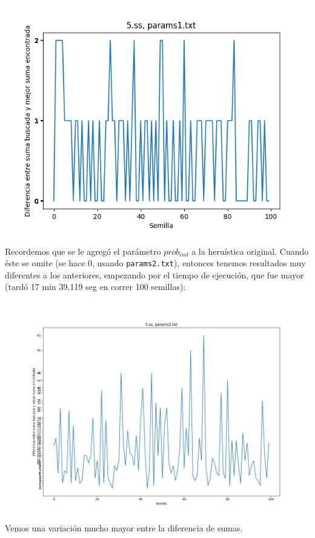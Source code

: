 \documentclass[12pt]{article}
\begin{document}
\begin{center}
  \includegraphics[scale=0.6]{media/5p1} \\
\end{center}

Recordemos que se le agregó el parámetro $prob_{ind}$ a la heruística original. Cuando éste se omite (se hace 0, usando \texttt{params2.txt}), entonces tenemos resultados muy diferentes a los anteriores, empezando por el tiempo de ejecución, que fue mayor (tardó 17 min 39.119 seg en correr 100 semillas):

\hspace*{-2cm}  \includegraphics[scale=0.6]{media/5p2} \\

Vemos una variación mucho mayor entre la diferencia de sumas. \\
\end{document}
